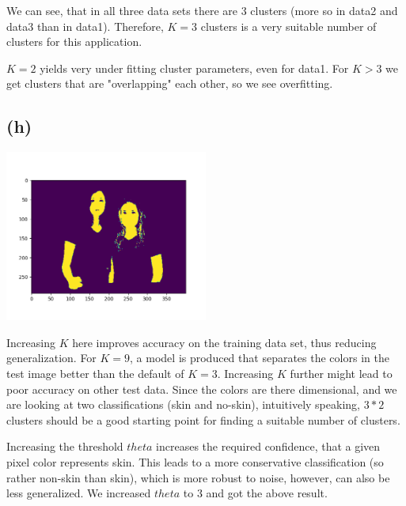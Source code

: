 We can see, that in all three data sets there are 3 clusters (more so in data2 and data3 than in data1). Therefore, $K=3$ clusters is a very suitable number of clusters for this application.

$K=2$ yields very under fitting cluster parameters, even for data1. For $K>3$ we get clusters that are "overlapping" each other, so we see overfitting.


\subsection*{(h)}
\includegraphics[width=0.5\textwidth]{Figure_5.png}

Increasing $K$ here improves accuracy on the training data set, thus reducing generalization. For $K=9$, a model is produced that separates the colors in the test image better than the default of $K=3$. Increasing $K$ further might lead to poor accuracy on other test data. Since the colors are there dimensional, and we are looking at two classifications (skin and no-skin), intuitively speaking, $3*2$ clusters should be a good starting point for finding a suitable number of clusters.

Increasing the threshold $theta$ increases the required confidence, that a given pixel color represents skin. This leads to a more conservative classification (so rather non-skin than skin), which is more robust to noise, however, can also be less generalized. We increased $theta$ to $3$ and got the above result.

